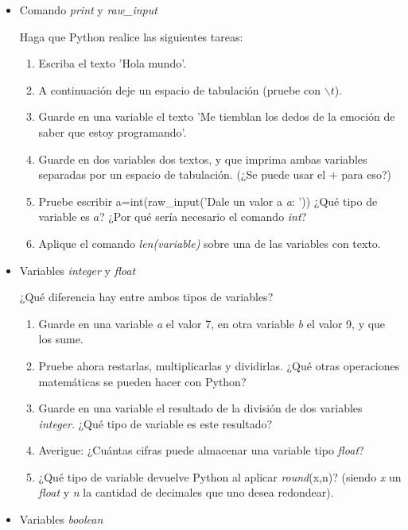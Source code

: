 ﻿\documentclass[twoside]{article}
\begin{document}
\begin{itemize}

\item Comando \textit{print} y \textit{raw\_input}

Haga que Python realice las siguientes tareas:

\begin{enumerate}
 \item Escriba el texto 'Hola mundo'.
 \item A continuación deje un espacio de tabulación (pruebe con $\backslash t$).
 
 \item Guarde en una variable el texto 'Me tiemblan los dedos de la emoción de saber que estoy programando'.
 \item Guarde en dos variables dos textos, y que imprima ambas variables separadas por un espacio de tabulación. (¿Se puede usar el + para eso?)
 \item Pruebe escribir a=int(raw\_input('Dale un valor a \textit{a}: ')) ¿Qué tipo de variable es $a$? ¿Por qué sería necesario el comando \textit{int}?
 \item Aplique el comando \textit{len(variable)} sobre una de las variables con texto.
\end{enumerate}


\item Variables \textit{integer} y \textit{float}

¿Qué diferencia hay entre ambos tipos de variables?

\begin{enumerate}
 \item Guarde en una variable \textit{a} el valor 7, en otra variable \textit{b} el valor 9, y que los sume.
 \item Pruebe ahora restarlas, multiplicarlas y dividirlas. ¿Qué otras operaciones matemáticas se pueden hacer con Python?
 \item Guarde en una variable el resultado de la división de dos variables \textit{integer}. ¿Qué tipo de variable es este resultado?
 \item Averigue: ¿Cuántas cifras puede almacenar una variable tipo \textit{float}?
 \item ¿Qué tipo de variable devuelve Python al aplicar \textit{round}(x,n)? (siendo \textit{x} un \textit{float} y \textit{n} la cantidad de decimales que uno desea redondear).
\end{enumerate}


\item Variables \textit{boolean}


\end{itemize}
\end{document}
